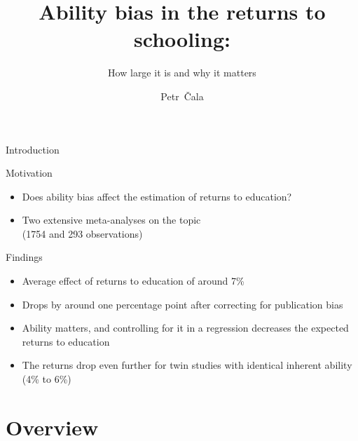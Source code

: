 \documentclass{beamer} %
\title[Ability bias and education] %
{Ability bias in the returns to schooling:}
\subtitle{How large it is and why it matters}
\author {Petr~\v{C}ala}
\institute[CUNI]
{
  Institute of Economic Studies\\
  Charles University, Prague\\
 
  \vspace{1.5em}

  \pgfdeclareimage[height=1.5cm]{logo}{Figures/logo.pdf} %
  \pgfuseimage{logo}

}
\date[June 19, 2024]
\begin{document}
\begin{frame}
    \titlepage
\end{frame}




\begin{frame}{Introduction}

    \begin{large}
        Motivation
    \end{large}

    \begin{itemize}
        \item<1-> Does ability bias affect the estimation of returns to education?
        \item<2-> Two extensive meta-analyses on the topic\\(1754 and 293 observations)
    \end{itemize}

    \begin{large}
        Findings
    \end{large}

    \begin{itemize}
        \item<1-> Average effect of returns to education of around 7\%
        \item<2-> Drops by around one percentage point after correcting for publication bias
        \item <3-> Ability matters, and controlling for it in a regression decreases the expected returns to education
        \item <4-> The returns drop even further for twin studies with identical inherent ability (4\% to 6\%)
    \end{itemize}

\end{frame}

\section{Overview}
\subsection{}
\end{document}
